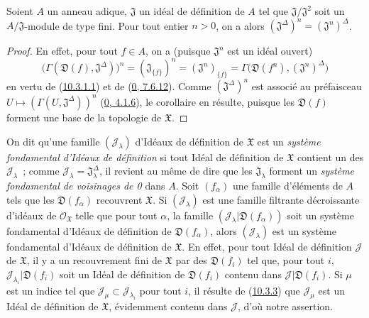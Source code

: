\begin{proposition}[10.3.6]
\label{I.10.3.6-fr}
Soient $A$ un anneau adique, $\mathfrak{J}$ un idéal de définition de $A$
tel que $\mathfrak{J}/\mathfrak{J}^2$ soit un
$A/\mathfrak{J}$-module de type fini. Pour tout entier $n>0$, on a alors
$(\mathfrak{J}^\Delta)^n=(\mathfrak{J}^n)^\Delta$.
\end{proposition}

\begin{proof}
En effet, pour tout $f\in A$, on a (puisque $\mathfrak{J}^n$ est un idéal
ouvert)
\[
  \bigl(\Gamma(\mathfrak{D}(f),\mathfrak{J}^\Delta)\bigr)^n
  =(\mathfrak{J}_{\{f\}})^n
  =(\mathfrak{J}^n)_{\{f\}}
  =\Gamma\bigl(\mathfrak{D}(f^n),(\mathfrak{J}^n)^\Delta\bigr)
\]
en vertu de (\hyperref[I.10.3.1.1-fr]{10.3.1.1}) et de
(\hyperref[0.7.6.12-fr]{0, 7.6.12}). Comme
$(\mathfrak{J}^\Delta)^n$ est associé au préfaisceau
$U\mapsto(\Gamma(U,\mathfrak{J}^\Delta))^n$
(\hyperref[0.4.1.6-fr]{0, 4.1.6}), le corollaire en résulte, puisque les
$\mathfrak{D}(f)$ forment une base de la topologie de $\mathfrak{X}$.
\end{proof}

\begin{env}[10.3.7]
\label{I.10.3.7-fr}
On dit qu'une famille $(\mathscr{J}_\lambda)$ d'Idéaux de définition de
$\mathfrak{X}$ est un \emph{système fondamental d'Idéaux de définition}
si tout Idéal de définition de $\mathfrak{X}$ contient un des
$\mathscr{J}_\lambda$~; comme
$\mathscr{J}_\lambda=\mathfrak{J}_\lambda^\Delta$, il revient au même de
dire que les $\mathfrak{J}_\lambda$ forment un \emph{système fondamental
de voisinages de 0} dans $A$. Soit $(f_\alpha)$ une famille d'éléments de
$A$ tels que les $\mathfrak{D}(f_\alpha)$ recouvrent $\mathfrak{X}$. Si
$(\mathscr{J}_\lambda)$ est une famille filtrante décroissante d'idéaux de
$\mathscr{O}_{\mathfrak{X}}$ telle que pour tout $\alpha$, la famille
$(\mathscr{J}_\lambda|\mathfrak{D}(f_\alpha))$ soit un système fondamental
d'Idéaux de définition de $\mathfrak{D}(f_\alpha)$, alors
$(\mathscr{J}_\lambda)$ est un système fondamental d'Idéaux de définition
de $\mathfrak{X}$. En effet, pour tout Idéal de définition $\mathscr{J}$
de $\mathfrak{X}$, il y a un recouvrement fini de $\mathfrak{X}$ par des
$\mathfrak{D}(f_i)$ tel que, pour tout $i$,
$\mathscr{J}_{\lambda_i}|\mathfrak{D}(f_i)$ soit un Idéal de définition
de $\mathfrak{D}(f_i)$ contenu dans
$\mathscr{J}|\mathfrak{D}(f_i)$. Si $\mu$ est un indice tel que
$\mathscr{J}_\mu\subset\mathscr{J}_{\lambda_i}$ pour tout $i$, il résulte
de (\hyperref[I.10.3.3-fr]{10.3.3}) que $\mathscr{J}_\mu$ est un Idéal de
définition de $\mathfrak{X}$, évidemment contenu dans $\mathscr{J}$, d'où
notre assertion.
\end{env}

